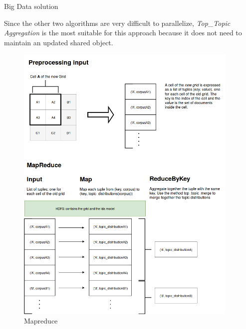 \documentclass[final]{beamer}
\newlength{\onecolwid}
\newlength{\twocolwid}
\begin{document}
\begin{frame}[t]
\begin{columns}[t]
\begin{column}{\twocolwid}
\begin{columns}[t,totalwidth=\twocolwid]
\begin{column}{\onecolwid}
\begin{block}{Big Data solution}

Since the other two algorithms are very difficult to parallelize, \emph{Top\_Topic Aggregation} is the most suitable for this approach because it does not need to maintain an updated shared object.

\begin{figure}[h]
	\includegraphics[scale=.9]{images/mapreduce}
	\caption{Mapreduce}
\end{figure}

\end{block}


\end{column} %

\begin{column}{\onecolwid} %


\end{column}
\end{columns}
\end{column}
\end{columns}
\end{frame}
\end{document}
